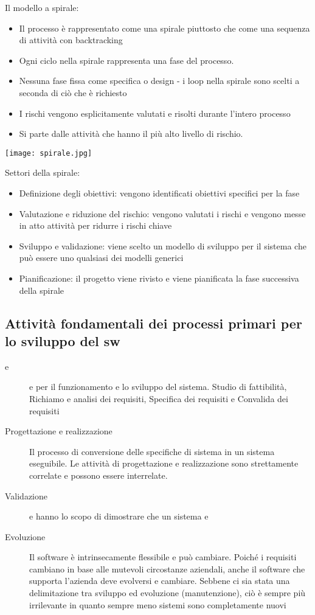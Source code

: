 Il modello a spirale:
\begin{itemize}
    \item Il processo è rappresentato come una spirale piuttosto che come una sequenza di attività con backtracking
    \item Ogni ciclo nella spirale rappresenta una fase del processo.
    \item Nessuna fase fissa come specifica o design - i loop nella spirale sono scelti a seconda di ciò che è richiesto
    \item I rischi vengono esplicitamente valutati e risolti durante l'intero processo
    \item Si parte dalle attività che hanno il più alto livello di rischio.
\end{itemize}
\texttt{[image: spirale.jpg]}

Settori della spirale:
\begin{itemize}
    \item Definizione degli obiettivi: vengono identificati obiettivi specifici per la fase
    \item Valutazione e riduzione del rischio: vengono valutati i rischi e vengono messe in atto attività per ridurre i rischi chiave
    \item Sviluppo e validazione: viene scelto un modello di sviluppo per il sistema che può essere uno qualsiasi dei modelli generici
    \item Pianificazione: il progetto viene rivisto e viene pianificata la fase successiva della spirale
\end{itemize}
\subsection{Attività fondamentali dei processi primari per lo sviluppo del sw}
\begin{description}
    \item[ e ]  e  per il funzionamento e lo sviluppo del sistema. Studio di fattibilità, Richiamo e analisi dei requisiti, Specifica dei requisiti e Convalida dei requisiti
    \item[Progettazione e realizzazione] Il processo di conversione delle specifiche di sistema in un sistema eseguibile. Le attività di progettazione e realizzazione sono strettamente correlate e possono essere interrelate.
    \item[Validazione]  e  hanno lo scopo di dimostrare che un sistema  e 
    \item[Evoluzione] Il software è intrinsecamente flessibile e può cambiare. Poiché i requisiti cambiano in base alle mutevoli circostanze aziendali, anche il software che supporta l'azienda deve evolversi e cambiare. Sebbene ci sia stata una delimitazione tra sviluppo ed evoluzione (manutenzione), ciò è sempre più irrilevante in quanto sempre meno sistemi sono completamente nuovi
\end{description}
